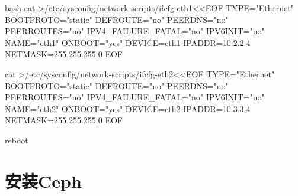 \begin{outline}[enumerate]
\begin{code-in-enumerate}{bash}
cat >/etc/sysconfig/network-scripts/ifcfg-eth1<<EOF
TYPE="Ethernet"
BOOTPROTO="static"
DEFROUTE="no"
PEERDNS="no"
PEERROUTES="no"
IPV4_FAILURE_FATAL="no"
IPV6INIT="no"
NAME="eth1"
ONBOOT="yes"
DEVICE=eth1
IPADDR=10.2.2.4
NETMASK=255.255.255.0
EOF

cat >/etc/sysconfig/network-scripts/ifcfg-eth2<<EOF
TYPE="Ethernet"
BOOTPROTO="static"
DEFROUTE="no"
PEERDNS="no"
PEERROUTES="no"
IPV4_FAILURE_FATAL="no"
IPV6INIT="no"
NAME="eth2"
ONBOOT="yes"
DEVICE=eth2
IPADDR=10.3.3.4
NETMASK=255.255.255.0
EOF

reboot
\end{code-in-enumerate}

\end{outline}

\section{安装Ceph}
